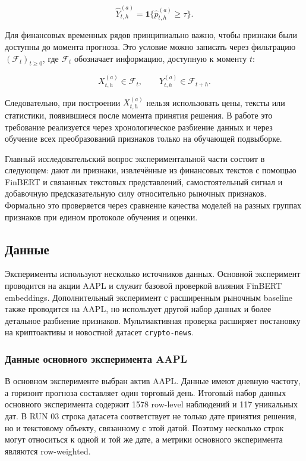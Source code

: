 \[
\widehat{Y}_{t,h}^{(a)} = \mathbf{1}\{\widehat{p}_{t,h}^{(a)} \geq \tau\}.
\]

Для финансовых временных рядов принципиально важно, чтобы признаки были доступны до момента прогноза. Это условие можно записать через фильтрацию $(\mathcal{F}_t)_{t \geq 0}$, где $\mathcal{F}_t$ обозначает информацию, доступную к моменту $t$:

\[
X_{t,h}^{(a)} \in \mathcal{F}_t,
\qquad
Y_{t,h}^{(a)} \in \mathcal{F}_{t+h}.
\]

Следовательно, при построении $X_{t,h}^{(a)}$ нельзя использовать цены, тексты или статистики, появившиеся после момента принятия решения. В работе это требование реализуется через хронологическое разбиение данных и через обучение всех преобразований признаков только на обучающей подвыборке.

Главный исследовательский вопрос экспериментальной части состоит в следующем: дают ли признаки, извлечённые из финансовых текстов с помощью FinBERT и связанных текстовых представлений, самостоятельный сигнал и добавочную предсказательную силу относительно рыночных признаков. Формально это проверяется через сравнение качества моделей на разных группах признаков при едином протоколе обучения и оценки.

\subsection{Данные}

Эксперименты используют несколько источников данных. Основной эксперимент проводится на акции AAPL и служит базовой проверкой влияния FinBERT embeddings. Дополнительный эксперимент с расширенным рыночным baseline также проводится на AAPL, но использует другой набор данных и более детальное разбиение признаков. Мультиактивная проверка расширяет постановку на криптоактивы и новостной датасет \texttt{crypto-news}.

\subsubsection{Данные основного эксперимента AAPL}

В основном эксперименте выбран актив AAPL. Данные имеют дневную частоту, а горизонт прогноза составляет один торговый день. Итоговый набор данных основного эксперимента содержит 1578 row-level наблюдений и 117 уникальных дат. В RUN 03 строка датасета соответствует не только дате принятия решения, но и текстовому объекту, связанному с этой датой. Поэтому несколько строк могут относиться к одной и той же дате, а метрики основного эксперимента являются row-weighted.

